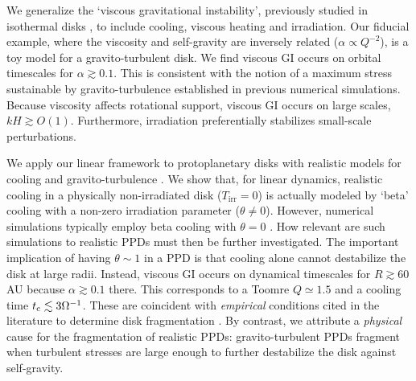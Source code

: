 We generalize the `viscous gravitational instability', previously 
studied in isothermal disks
\citep{lynden-bell74,willerding92,gammie96}, to include 
cooling, viscous heating and irradiation. Our fiducial example,  
where the viscosity and self-gravity are inversely
related ($\alpha\propto Q^{-2}$), is a toy model for a
gravito-turbulent disk. We find viscous GI occurs on orbital  
timescales for $\alpha\gtrsim 0.1$. This is consistent with the notion
of a maximum stress sustainable by gravito-turbulence established in
previous numerical simulations. Because viscosity affects
rotational support, viscous GI occurs on large scales, $kH\gtrsim
O(1)$.  Furthermore, irradiation preferentially
stabilizes small-scale perturbations.     


We apply our linear framework to protoplanetary disks with 
realistic models for cooling and gravito-turbulence
\citep{rafikov15}. We show that, for linear dynamics, realistic 
cooling in a physically non-irradiated disk ($T_\mathrm{irr}=0$) is
actually modeled by `beta' cooling with a  
non-zero irradiation parameter ($\theta\neq0$). However, 
numerical simulations typically employ beta cooling with 
$\theta=0$ \citep[e.g.][]{gammie01}. How relevant 
are such simulations to realistic PPDs must then be further 
investigated. The important implication of having 
$\theta\sim 1$ in a PPD is that cooling alone cannot 
destabilize the disk at large radii. Instead, viscous GI occurs on
dynamical timescales for $R\gtrsim 60$AU because 
$\alpha\gtrsim0.1$ there. This corresponds to a Toomre $Q\simeq 1.5$ and 
a cooling time $t_\mathrm{c}\lesssim 3\Omega^{-1}$. These are coincident with 
\emph{empirical} conditions cited in the literature to determine disk
fragmentation 
\citep[e.g.][]{rafikov15}. By contrast, we attribute a \emph{physical}
cause for the fragmentation of realistic PPDs: gravito-turbulent PPDs
fragment when turbulent stresses are large enough to further
destabilize the disk against self-gravity.    



